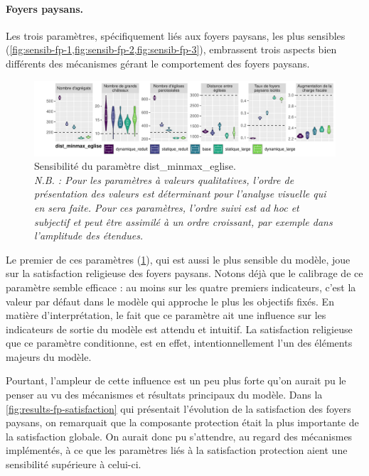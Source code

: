 \paragraph{Foyers paysans.}
Les trois paramètres, spécifiquement liés aux foyers paysans, les plus sensibles (\cref{fig:sensib-fp-1,fig:sensib-fp-2,fig:sensib-fp-3}), embrassent trois aspects bien différents des mécanismes gérant le comportement des foyers paysans.

\begin{figure}[H]
	\centering
	\includegraphics[width=\linewidth]{img/sensib/sensibilite_dist_minmax_eglise.pdf}
	\caption[Sensibilité du paramètre \textsf{dist\_minmax\_eglise}.]{Sensibilité du paramètre \textsf{dist\_minmax\_eglise}.\\
\textit{	N.B. : Pour les paramètres à valeurs qualitatives, l'ordre de présentation des valeurs est déterminant pour l'analyse visuelle qui en sera faite.
	Pour ces paramètres, l'ordre suivi est \textit{ad hoc} et subjectif et peut être assimilé à un ordre croissant, par exemple dans l'amplitude des étendues.}}
	\label{fig:sensib-fp-1}
\end{figure}

Le premier de ces paramètres (\cref{fig:sensib-fp-1}), qui est aussi le plus sensible du modèle, joue sur la satisfaction religieuse des foyers paysans.
Notons déjà que le calibrage de ce paramètre semble efficace : au moins sur les quatre premiers indicateurs, c'est la valeur par défaut dans le modèle qui approche le plus les objectifs fixés.
En matière d'interprétation, le fait que ce paramètre ait une influence sur les indicateurs de sortie du modèle est attendu et intuitif.
La satisfaction religieuse que ce paramètre conditionne, est en effet, intentionnellement l'un des éléments majeurs du modèle.

Pourtant, l'ampleur de cette influence est un peu plus forte qu'on aurait pu le penser au vu des mécanismes et résultats principaux du modèle.
Dans la \cref{fig:results-fp-satisfaction} qui présentait l'évolution de la satisfaction des foyers paysans, on remarquait que la composante \og protection\fg{} était la plus importante de la satisfaction globale.
On aurait donc pu s'attendre, au regard des mécanismes implémentés, à ce que les paramètres liés à la satisfaction protection aient une sensibilité supérieure à celui-ci.

